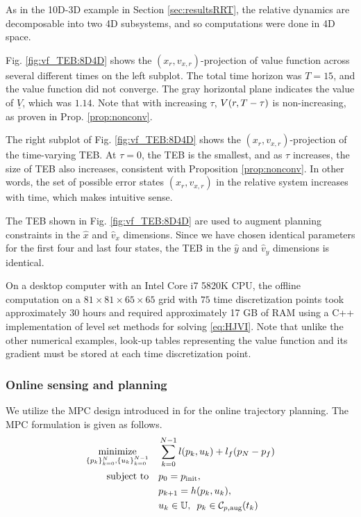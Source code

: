 As in the 10D-3D example in Section \ref{sec:resultsRRT}, the relative dynamics are decomposable into two 4D subsystems, and so computations were done in 4D space.

Fig. \ref{fig:vf_TEB:8D4D} shows the $(x_r, v_{x,r})$-projection of value function across several different times on the left subplot.
The total time horizon was $T=15$, and the value function did not converge.
The gray horizontal plane indicates the value of $\underline V$, which was $1.14$.
Note that with increasing $\tau$, $V(r,T-\tau)$ is non-increasing, as proven in Prop. \ref{prop:nonconv}.

The right subplot of Fig. \ref{fig:vf_TEB:8D4D} shows the $(x_r, v_{x,r})$-projection of the time-varying TEB.
At $\tau=0$, the TEB is the smallest, and as $\tau$ increases, the size of TEB also increases, consistent with Proposition \ref{prop:nonconv}.
In other words, the set of possible error states $(x_r, v_{x,r})$ in the relative system increases with time, which makes intuitive sense.

The TEB shown in Fig. \ref{fig:vf_TEB:8D4D} are used to augment planning constraints in the $\hat x$ and $\hat v_x$ dimensions.
Since we have chosen identical parameters for the first four and last four states, the TEB in the $\hat y$ and $\hat v_y$ dimensions is identical.

On a desktop computer with an Intel Core i7 5820K CPU, the offline computation on a $81\times81\times65\times65$ grid with $75$ time discretization points took approximately 30 hours and  required approximately 17 GB of RAM using a C++ implementation of level set methods for solving \eqref{eq:HJVI}.
Note that unlike the other numerical examples, look-up tables representing the value function and its gradient must be stored at each time discretization point.

\subsubsection{Online sensing and planning}
%
We utilize the MPC design introduced in \cite{Zhang2017} for the online trajectory planning. The MPC formulation is given as follows.
%
\begin{subequations} \label{eq:MPC}
  \begin{align}
  \underset{\{p_k\}_{k=0}^N, \{u_k\}_{k=0}^{N-1}}{\text{minimize}} \quad
  & \sum^{N-1}_{k=0} l(p_k,u_k) + l_f(p_N-p_f)  \\
  \text{subject to} \quad & p_0 = p_{\text{init}},\\
  &p_{k+1} = h(p_k,u_k),\\
  & u_k \in \mathbb{U},\enspace p_k \in \mathcal C_{p,\text{aug}}(t_k) 
  \end{align}
\end{subequations}

